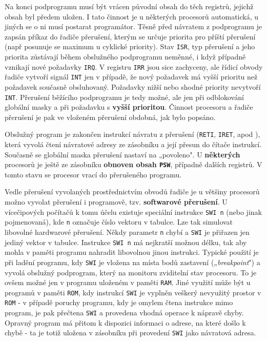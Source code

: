       Na konci podprogramu musí být vrácen původní obsah do těch registrů, jejichž obsah byl předem 
      uložen. I tato činnost je u některých procesorů automatická, u jiných se o ni musí postarat 
      programátor. Těsně před návratem z podprogramu je zapsán příkaz do řadiče přerušení, kterým 
      se určuje priorita pro příští přerušení (např posunuje se maximum u cyklické priority). Stav 
      \texttt{ISR}, typ přerušení a jeho priorita zůstávají během obslužného podprogramu neměnné, i 
      když případně vznikají nové požadavky \texttt{IRQ}. V registru \texttt{IRR} jsou sice 
      zachyceny, ale řídicí obvody řadiče vytvoří signál \texttt{INT} jen v případě, že nový 
      požadavek má vyšší prioritu než požadavek současně obsluhovaný. Požadavky nižší nebo shodné 
      priority nevytvoří \texttt{INT}. Přerušení běžícího podprogramu je tedy možné, ale jen při 
      odblokování globální masky a při požadavku s \textbf{vyšší prioritou}. Činnost procesoru a 
      řadiče přerušení je pak ve vloženém přerušení obdobná, jak bylo popsáno.
      
      Obslužný program je zakončen instrukcí návratu z přerušení (\texttt{RETI}, \texttt{IRET}, 
      apod ), která vyvolá čtení návratové adresy ze zásobníku a její přesun do čítače instrukcí. 
      Současně se globální maska přerušení nastaví na „povoleno". U \textbf{některých} procesorů je 
      ještě ze zásobníku \textbf{obnoven obsah \texttt{PSW}}, případně dalších registrů. V tomto 
      stavu se procesor vrací do přerušeného programu.
      
      Vedle přerušení vyvolaných prostřednictvím obvodů řadiče je u většiny procesorů možno vyvolat 
      přerušení i programově, tzv. \textbf{softwarové přerušení}. U vícečipových počítačů k tomu 
      účelu existuje speciální instrukce \texttt{SWI n} (nebo jinak pojmenovaná), kde \texttt{n} 
      označuje číslo vektoru v tabulce. Lze tak simulovat libovolné hardwarové přerušení. Někdy 
      parametr \texttt{n} chybí a \texttt{SWI} je přiřazen jen jediný vektor v tabulce. Instrukce 
      \texttt{SWI n} má nejkratší možnou délku, tak aby mohla v paměti programu nahradit libovolnou 
      jinou instrukci. Typické použití je při ladění programu, kdy \texttt{SWI} je vložena na místa 
      bodů zastavení („\emph{breakpoint}") a vyvolá obslužný podprogram, který na monitoru 
      zviditelní stav procesoru. To je ovšem možné jen v programu uloženém v paměti \texttt{RAM}. 
      Jiné využití může být u programů v paměti \texttt{ROM}, kdy instrukcí \texttt{SWI} je vyplněn 
      veškerý nevyužitý prostor v \texttt{ROM} - v případě poruchy programu, kdy je omylem čtena 
      instrukce mimo program, je pak přečtena \texttt{SWI} a provedena vhodná operace k nápravě 
      chyby. Opravný program má přitom k dispozici informaci o adrese, na které došlo k chybě - ta 
      je totiž uložena v zásobníku při provedení \texttt{SWI} jako návratová adresa.
      
